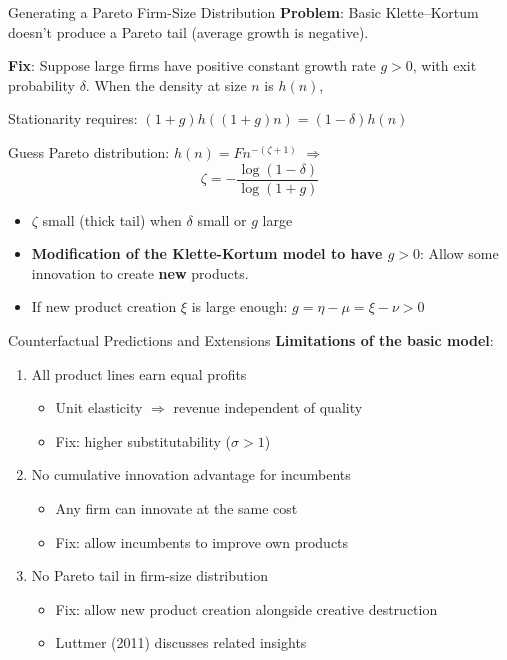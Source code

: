 \documentclass[blue]{beamer}
\begin{document}
\begin{frame}{Generating a Pareto Firm-Size Distribution}
	\textbf{Problem}: Basic Klette--Kortum doesn't produce a Pareto tail (average growth is negative).
	
	\bigskip
	\textbf{Fix}: Suppose large firms have positive constant growth rate $g > 0$, with exit probability $\delta$. When the density at size $n$ is $h(n)$,
	
	\medskip
	Stationarity requires: $(1+g) h((1+g)n) = (1-\delta) h(n)$
	
	\medskip
	Guess Pareto distribution: $h(n) = F n^{-(\zeta + 1)}$ $\Rightarrow$
	\[
 {\zeta = -\frac{\log(1-\delta)}{\log(1+g)}}
	\]
	
	\begin{itemize}
		\item $\zeta$ small (thick tail) when $\delta$ small or $g$ large
		\item \textbf{Modification of the Klette-Kortum model to have $g>0$}: Allow some innovation to create \textbf{new} products.
		\item If new product creation $\xi$ is large enough: $g=\eta - \mu = \xi - \nu > 0$
	\end{itemize}
\end{frame}

\begin{frame}{Counterfactual Predictions and Extensions}
	\textbf{Limitations of the basic model}:
	\begin{enumerate}
		\item All product lines earn equal profits
		\begin{itemize}
			\item Unit elasticity $\Rightarrow$ revenue independent of quality
			\item Fix: higher substitutability ($\sigma > 1$)
		\end{itemize}
		
		\bigskip
		\item No cumulative innovation advantage for incumbents
		\begin{itemize}
			\item Any firm can innovate at the same cost
			\item Fix: allow incumbents to improve own products
		\end{itemize}
		
		\bigskip
		\item No Pareto tail in firm-size distribution
		\begin{itemize}
			\item Fix: allow new product creation alongside creative destruction
			\item Luttmer (2011) discusses related insights
		\end{itemize}
	\end{enumerate}
\end{frame}
\end{document}
